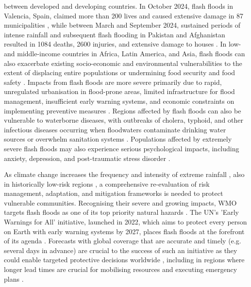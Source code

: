 \noindent between developed and developing countries. In October 2024, flash floods in Valencia, Spain, claimed more than 200 lives and caused extensive damage in 87 municipalities \citep{Grau-Bove_2024}, while between March and September 2024, sustained periods of intense rainfall and subsequent flash flooding in Pakistan and Afghanistan resulted in 1084 deaths, 2600 injuries, and extensive damage to houses \citep{Wikipedia_2025}. In low- and middle-income countries in Africa, Latin America, and Asia, flash floods can also exacerbate existing socio-economic and environmental vulnerabilities to the extent of displacing entire populations \citep{Stephens_2024} or undermining food security and food safety \citep{Agabiirwe_2022, Duchenne-Moutien_2021}. Impacts from flash floods are more severe primarily due to rapid, unregulated urbanisation in flood-prone areas, limited infrastructure for flood management, insufficient early warning systems, and economic constraints on implementing preventive measures \citep{Douglas_2017, Pinos_2022, Wang_2021b}. Regions affected by flash floods can also be vulnerable to waterborne diseases, with outbreaks of cholera, typhoid, and other infectious diseases occurring when floodwaters contaminate drinking water sources or overwhelm sanitation systems \citep{Lee_2020}. Populations affected by extremely severe flash floods may also experience serious psychological impacts, including anxiety, depression, and post-traumatic stress disorder \citep{Iqbal_2023}. 

As  climate change increases the frequency and intensity of extreme rainfall \citep{WMO_2025, IPCC_2023}, also in historically low-risk regions \citep{Fowler_2021c}, a comprehensive re-evaluation of risk management, adaptation, and mitigation frameworks is needed to protect vulnerable communities. Recognising their severe and growing impacts, WMO targets flash floods as one of its top priority natural hazards \citep{WMO_2025}. The UN's 'Early Warnings for All' initiative, launched in 2022, which aims to protect every person on Earth with early warning systems by 2027, places flash floods at the forefront of its agenda \citep{UN_2022}. Forecasts with global coverage that are accurate and timely (e.g. several days in advance) are crucial to the success of such an initiative as they could enable targeted protective decisions worldwide \citep{Merz_2020}, including in regions where longer lead times are crucial for mobilising resources and executing emergency plans \citep{Bazo_2019}. 

